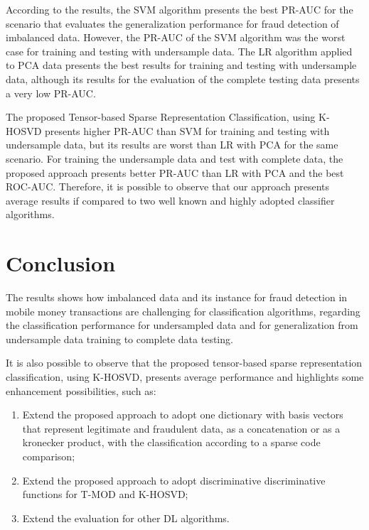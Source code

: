 According to the results, the SVM algorithm presents the best PR-AUC for the scenario that evaluates the generalization performance for fraud detection of imbalanced data. However, the PR-AUC of the SVM algorithm was the worst case for training and testing with undersample data. The LR algorithm applied to PCA data presents the best results for training and testing with undersample data, although its results for the evaluation of the complete testing data presents a very low PR-AUC. 

The proposed Tensor-based Sparse Representation Classification, using K-HOSVD presents higher PR-AUC than SVM for training and testing with undersample data, but its results are worst than LR with PCA for the same scenario. For training the undersample data and test with complete data, the proposed approach presents better PR-AUC than LR with PCA and the best ROC-AUC. Therefore, it is possible to observe that our approach presents average results if compared to two well known and highly adopted classifier algorithms.




\section{Conclusion}
\label{sec:4_conclusion}

The results shows how imbalanced data and its instance for fraud detection in mobile money transactions are challenging for classification algorithms, regarding the classification performance for undersampled data and for generalization from undersample data training to complete data testing. 

It is also possible to observe that the proposed tensor-based sparse representation classification, using K-HOSVD, presents average performance and highlights some enhancement possibilities, such as:

\begin{enumerate}
	\item Extend the proposed approach to adopt one dictionary with basis vectors that represent legitimate and fraudulent data, as a concatenation or as a kronecker product, with the classification according to a sparse code comparison;
	\item Extend the proposed approach to adopt discriminative discriminative functions for T-MOD and K-HOSVD;
	\item Extend the evaluation for other DL algorithms.
\end{enumerate}

